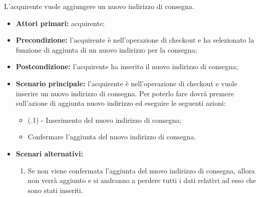 
L'acquirente vuole aggiungere un nuovo indirizzo di consegna.
\begin{itemize}
    \item \textbf{Attori primari:} acquirente;
    \item \textbf{Precondizione:} l'acquirente è nell'operazione di checkout e ha selezionato la funzione di aggiunta di un nuovo indirizzo per la consegna;
    \item \textbf{Postcondizione:} l'acquirente ha inserito il nuovo indirizzo di consegna;
    \item \textbf{Scenario principale:} l'acquirente è nell'operazione di checkout e vuole inserire un nuovo indirizzo di consegna. Per poterlo fare dovrà premere sull'azione di aggiunta nuovo indirizzo ed eseguire le seguenti azioni:
    \begin{itemize}
        \item (\actualUC.1) - Inserimento del nuovo indirizzo di consegna; 
        \item Confermare l'aggiunta del nuovo indirizzo di consegna.
    \end{itemize}
    \item \textbf{Scenari alternativi:}
    \begin{enumerate}[label=\lett]
        \item Se non viene confermata l'aggiunta del nuovo indirizzo di consegna, allora non verrà aggiunto e si andranno a perdere tutti i dati relativi ad esso che sono stati inseriti.
    \end{enumerate}
\end{itemize}

\resetSubUC

